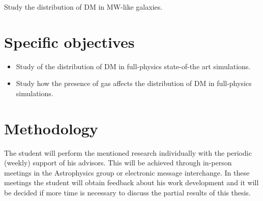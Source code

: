 \documentclass[12pt]{article}
\begin{document}

Study the distribution of DM in MW-like galaxies.

\section{Specific objectives}


\begin{itemize}
	\item Study of the distribution of DM in full-physics state-of-the art simulations.

	\item Study how the presence of gas affects the distribution of DM in full-physics simulations.
	
\end{itemize}

\section{Methodology}




The student will perform the mentioned research individually with the periodic (weekly) support of his advisors. This will be achieved through in-person meetings in the Astrophysics group or electronic message interchange. 
In these meetings the student will obtain feedback about his work development and it will be decided if more time is necessary to discuss the partial results of this thesis. \\
\end{document}
